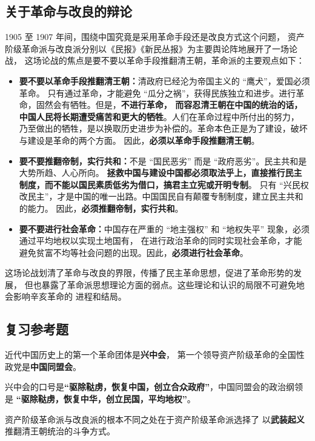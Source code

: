 \documentclass[10pt, UTF8]{ctexbook} %
\begin{document}
\subsection{关于革命与改良的辩论}

1905 至 1907 年间，围绕中国究竟是采用革命手段还是改良方式这个问题，
资产阶级革命派与改良派分别以《民报》《新民丛报》为主要舆论阵地展开了一场论战，
这场论战的焦点是要不要以革命手段推翻清王朝，革命派的主要观点如下：
\begin{itemize}[itemsep=0pt]
    \item \textbf{要不要以革命手段推翻清王朝：}清政府已经沦为帝国主义的 “鹰犬”，爱国必须革命。
    只有通过革命，才能避免 “瓜分之祸”，获得民族独立和进步。进行革命，固然会有牺牲。但是，\textbf{不进行革命，
    而容忍清王朝在中国的统治的话，中国人民将长期遭受痛苦和更大的牺牲}。人们在革命过程中所付出的努力，
    乃至做出的牺牲，是以换取历史进步为补偿的。革命本色正是为了建设，破坏与建设是革命的两个方面。
    因此，\textbf{必须以革命手段推翻清王朝}。
    \item \textbf{要不要推翻帝制，实行共和：}不是 “国民恶劣” 而是 “政府恶劣”。民主共和是大势所趋、人心所向。
    \textbf{拯救中国与建设中国都必须取法乎上，直接推行民主制度，而不能以国民素质低劣为借口，搞君主立宪或开明专制}。
    只有 “兴民权改民主”，才是中国的唯一出路。中国国民自有颠覆专制制度，建立民主共和的能力。
    因此，\textbf{必须推翻帝制，实行共和}。
    \item \textbf{要不要进行社会革命：}中国存在严重的 “地主强权” 和 “地权失平” 现象，必须通过平均地权以实现土地国有，
    在进行政治革命的同时实现社会革命，才能避免贫富不均等社会问题的出现。因此，\textbf{必须进行社会革命}。
\end{itemize}
这场论战划清了革命与改良的界限，传播了民主革命思想，促进了革命形势的发展，
但也暴露了革命派思想理论方面的弱点。这些理论和认识的局限不可避免地会影响辛亥革命的
进程和结局。

\subsection{复习参考题}

\begin{example}
    近代中国历史上的第一个革命团体是\textbf{兴中会}，
    第一个领导资产阶级革命的全国性政党是\textbf{中国同盟会}。
\end{example}
\begin{example}
    兴中会的口号是\textbf{“驱除鞑虏，恢复中国，创立合众政府”}，中国同盟会的政治纲领是
    \textbf{“驱除鞑虏，恢复中华，创立民国，平均地权”}。
\end{example}
\begin{example}
    资产阶级革命派与改良派的根本不同之处在于资产阶级革命派选择了
    以\textbf{武装起义}推翻清王朝统治的斗争方式。
\end{example}
\end{document}
